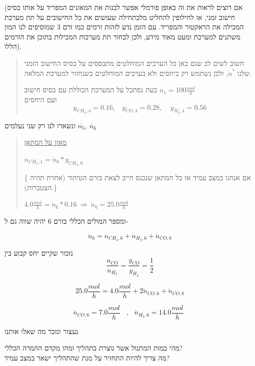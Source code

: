\documentclass[
  hebrew,
  letterpaper,
  DIV=11,
  numbers=noendperiod]{scrreprt}
\begin{document}
(אם רוצים לראות את זה באופן פורמלי אפשר לבנות את המאזנים המפריד על אותו
בסיס חישוב זמני, או לחילופין להחליט מלכתחילה שעושים את כל החישובים על תת
מערכת המכילה את הראקטור והמפריד. עם הזמן נדע לזהות זרמים כמו זרם 3
שמוסיפים לנו המון משתנים למערכת ומעט מאוד מידע, ולכן לבחור תת מערכות
המכילות בתוכן את הזרמים הללו).

\begin{quote}
חשוב לשים לב שגם כאן כל הערכים המוחלטים מתבססים על בסיס החישוב הזמני
שלנו \({\dot{n}}^{*}\), ולכן נשתמש רק ביחסים ולא בערכים המוחלטים כשנחזור
למערכת המלאה.

כעת נסתכל על המערכת הכוללת עם בסיס חישוב
\(\dot{n_{1}} = 100\frac{mol}{h}\)\\
ועם היחסים\\
\[y_{CH_{4},4} = 0.16,\ \ \ \ y_{CO,4} = 0.28,\ \ \ \ \ y_{H_{2},4} = 0.56\]
\end{quote}

ונשארו לנו רק שני נעלמים \(\dot{n_{5},}\ \dot{n_{6}}\)

\begin{quote}
\ul{מאזן על המתאן}

\({\dot{n}}_{CH_{4},1} = {\dot{n}}_{6}*y_{CH_{4},6}\)

\{ אם אנחנו במצב עמיד אז כל המתאן שנכנס חייב לצאת בזרם הטיהור (אחרת תהיה
הצטברות).\}

\(4.0\frac{mol}{h} = {\dot{n}}_{6}*0.16\  \Rightarrow \ {\dot{n}}_{6} = 25.0\frac{mol}{h}\)
\end{quote}

ומספר המולים הכללי בזרם 6 יהיה שווה גם ל-

\[{\dot{n}}_{6} = {\dot{n}}_{CH_{4},6} + {\dot{n}}_{H_{2},6} + {\dot{n}}_{CO,6}\]

נזכור שקיים יחס קבוע בין
\[\frac{n_{CO}}{n_{H_{2}}} = \frac{y_{CO}}{y_{H_{2}}} = \frac{1}{2}\]

\[25.0\frac{mol}{h} = 4.0\frac{mol}{h} + 2{\dot{n}}_{CO,6} + {\dot{n}}_{CO,6}\]

\[{\dot{n}}_{CO,6} = 7.0\frac{mol}{h}\ \ \ \ ,\ \ \ {\dot{n}}_{H_{2},6} = 14.0\frac{mol}{h}\ \ \]

נעצור ונזכר מה שאלו אותנו

מהי כמות המתנול אשר נוצרת בתהליך ומהו מקדם ההמרה הכללי?\\
מה צריך להיות התחזיר על מנת שהתהליך ישאר במצב עמיד?
\end{document}
